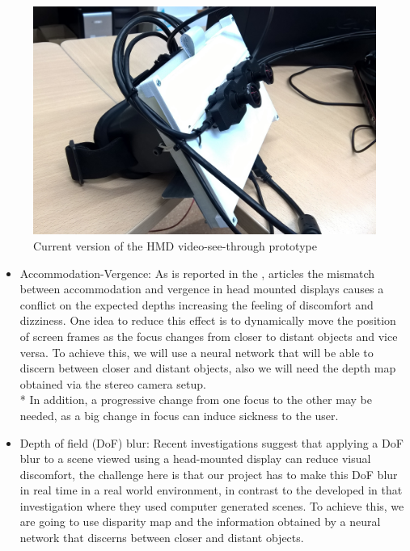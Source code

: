 \documentclass[10pt,a4paper,twocolumn,twoside]{article}
\begin{document}
	\begin{figure}
		\centering
		\includegraphics[width=1\linewidth]{img/231.jpg}
		\caption{Current version of the HMD video-see-through prototype}
		\label{fig:proto}
	\end{figure}
	
	\begin{itemize}
		\item Accommodation-Vergence: As is reported in the \cite{disconfortReview}, \cite{vergenceDisconfort} articles the mismatch between accommodation and vergence in head mounted displays causes a conflict on the expected depths increasing the feeling of discomfort and dizziness.  One idea to reduce this effect is to dynamically move the position of screen frames as the focus changes from closer to distant objects and vice versa. To achieve this, we will use a neural network that will be able to discern between closer and distant objects, also we will need the depth map obtained via the stereo camera setup. \\*
		In addition, a progressive change from one focus to the other may be needed, as a big change in focus can induce sickness to the user.
		
		\item Depth of field (DoF) blur: Recent investigations \cite{ifftConfortDoF} suggest that applying a DoF blur to a scene viewed using a head-mounted display can reduce visual discomfort, the challenge here is that our project has to make this DoF blur in real time in a real world environment, in contrast to the developed in that investigation where they used computer generated scenes. To achieve this, we are going to use disparity map and the information obtained by a neural network that discerns between closer and distant objects.
	\end{itemize} 
	
\end{document}
